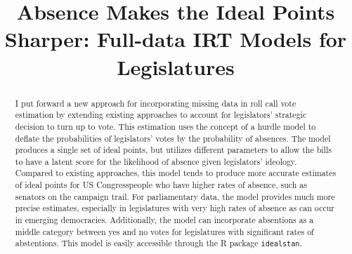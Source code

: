 %

\title{Absence Makes the Ideal Points Sharper: Full-data IRT Models for Legislatures}
\usepackage{amsmath,amsthm, amssymb, latexsym}
\linespread{1.5}

	
	\maketitle
	
	\begin{abstract}
		I put forward a new approach for incorporating missing data in roll call vote estimation by extending existing approaches to account for legislators' strategic decision to turn up to vote. This estimation uses the concept of a hurdle model to deflate the probabilities of legislators' votes by the probability of absences. The model produces a single set of ideal points, but utilizes different parameters to allow the bills to have a latent score for the likelihood of absence given legislators' ideology. Compared to existing approaches, this model tends to produce more accurate estimates of ideal points for US Congresspeople who have higher rates of absence, such as senators on the campaign trail. For parliamentary data, the model provides much more precise estimates, especially in legislatures with very high rates of absence as can occur in emerging democracies. Additionally, the model can incorporate absentions as a middle category between yes and no votes for legislatures with significant rates of abstentions. This model is easily accessible through the R package \texttt{idealstan}.
	\end{abstract}
	
	
